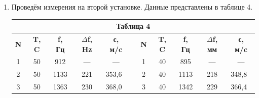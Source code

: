 \documentclass[11pt,a4paper,oneside]{article}
\begin{document}
\begin{enumerate}
		
		\item Проведём измерения на второй установке. Данные представлены в таблице 4.
\begin{center}
\begin{table}[h!]
\begin{tabular}{cccclcccccl}
\multicolumn{11}{c}{\textbf{Таблица 4}}                                                                                                                                                                                                                                                                                                                                                                             \\ \hline
\multicolumn{1}{|c|}{\textbf{N}} & \multicolumn{1}{c|}{\textbf{T, C}} & \multicolumn{1}{c|}{\textbf{f, Гц}} & \multicolumn{1}{c|}{\textbf{$\Delta$f, Hz}} & \multicolumn{1}{c|}{\textbf{с, м/c}} & \multicolumn{1}{c|}{} & \multicolumn{1}{c|}{\textbf{N}} & \multicolumn{1}{c|}{\textbf{T, C}} & \multicolumn{1}{c|}{\textbf{f, Гц}} & \multicolumn{1}{c|}{\textbf{$\Delta$f, мм}} & \multicolumn{1}{c|}{\textbf{с, м/c}} \\ \cline{1-5} \cline{7-11} 
\multicolumn{1}{|c|}{1}          & \multicolumn{1}{c|}{50}            & \multicolumn{1}{c|}{912}            & \multicolumn{1}{c|}{---}                    & \multicolumn{1}{c|}{---}             & \multicolumn{1}{c|}{} & \multicolumn{1}{c|}{1}          & \multicolumn{1}{c|}{40}            & \multicolumn{1}{c|}{895}            & \multicolumn{1}{c|}{---}                    & \multicolumn{1}{c|}{---}             \\ \cline{1-5} \cline{7-11} 
\multicolumn{1}{|c|}{2}          & \multicolumn{1}{c|}{50}            & \multicolumn{1}{c|}{1133}           & \multicolumn{1}{c|}{221}                    & \multicolumn{1}{l|}{353,6}           & \multicolumn{1}{c|}{} & \multicolumn{1}{c|}{2}          & \multicolumn{1}{c|}{40}            & \multicolumn{1}{c|}{1113}           & \multicolumn{1}{c|}{218}                    & \multicolumn{1}{l|}{348,8}           \\ \cline{1-5} \cline{7-11} 
\multicolumn{1}{|c|}{3}          & \multicolumn{1}{c|}{50}            & \multicolumn{1}{c|}{1363}           & \multicolumn{1}{c|}{230}                    & \multicolumn{1}{l|}{368,0}           & \multicolumn{1}{c|}{} & \multicolumn{1}{c|}{3}          & \multicolumn{1}{c|}{40}            & \multicolumn{1}{c|}{1342}           & \multicolumn{1}{c|}{229}                    & \multicolumn{1}{l|}{366,4}           \\ \cline{1-5} \cline{7-11} 

\end{tabular}
\end{table}
\end{center}
\end{enumerate}
\end{document}
